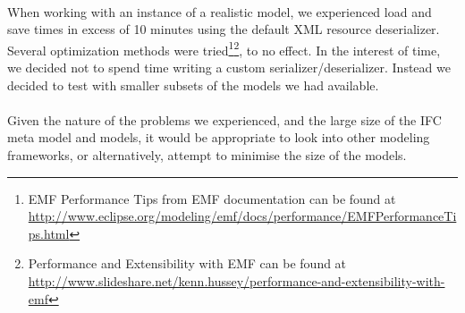 \paragraph{}
When working with an instance of a realistic model, we experienced load and save times in excess of 10 minutes using the default XML resource deserializer. Several optimization methods were tried\footnote{EMF Performance Tips from EMF documentation can be found at \url{http://www.eclipse.org/modeling/emf/docs/performance/EMFPerformanceTips.html}}\footnote{Performance and Extensibility with EMF can be found at \url{http://www.slideshare.net/kenn.hussey/performance-and-extensibility-with-emf}}, to no effect. In the interest of time, we decided not to spend time writing a custom serializer/deserializer. Instead we decided to test with smaller subsets of the models we had available.
\paragraph{}
Given the nature of the problems we experienced, and the large size of the IFC meta model and models, it would be appropriate to look into other modeling frameworks, or alternatively, attempt to minimise the size of the models.
